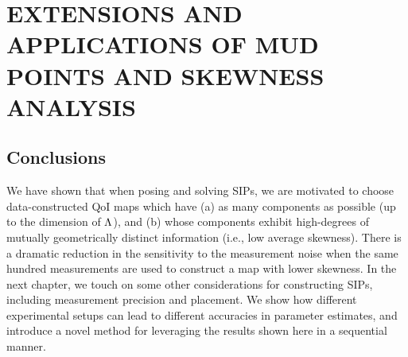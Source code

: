 \chapter{\uppercase{Extensions and Applications of MUD Points and Skewness Analysis} \label{chapter:vector-valued}}



\FloatBarrier

\section{Conclusions}

We have shown that when posing and solving SIPs, we are motivated to choose data-constructed QoI maps which have (a) as many components as possible (up to the dimension of ${\Lambda}$), and (b) whose components exhibit high-degrees of mutually geometrically distinct information (i.e., low average skewness).
There is a dramatic reduction in the sensitivity to the measurement noise when the same hundred measurements are used to construct a map with lower skewness.
In the next chapter, we touch on some other considerations for constructing SIPs, including measurement precision and placement.
We show how different experimental setups can lead to different accuracies in parameter estimates, and introduce a novel method for leveraging the results shown here in a sequential manner.
